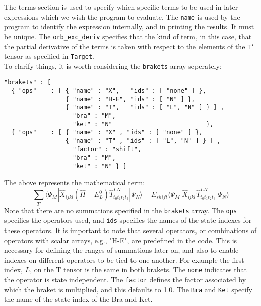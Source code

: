 The terms section is used to specify which specific terms to be used in later expressions
which we wish the program to evaluate.  The \texttt{name} is used by the program to
identify the expression internally, and in printing the results. It must be unique. 
The \texttt{orb\_exc\_deriv} specifies that the kind of term, in this case, that the partial
derivative of the terms is taken with respect to the elements of the
\texttt{T'} tensor as specified in \texttt{Target}.\\

\noindent To clarify things, it is worth considering the \texttt{brakets} array seperately:

\begin{lstlisting}[label={lst:brakets}]
"brakets" : [
  { "ops"    : [ { "name" : "X",   "ids" : [ "none" ] },
                 { "name" : "H-E", "ids" : [ "N" ] },
                 { "name" : "T",   "ids" : [ "L", "N" ] } ] ,
                   "bra" : "M",
                   "ket" : "N"                          }, 
  { "ops"    : [ { "name" : "X" , "ids" : [ "none" ] },
                 { "name" : "T" , "ids" : [ "L", "N" ] } ] ,
                   "factor" : "shift",
                   "bra" : "M",
                   "ket" : "N" } ] 
\end{lstlisting}         
The above represents the mathematical term:
\begin{equation}
\sum_{T'}
\langle \Psi_{M} |  \hat{X}_{ijkl} ( \hat{H}-E^{0}_{L} ) \hat{T}^{LN}_{ t_{0}t_{1}t_{2}t_{3} } | \Psi_{N} \rangle + 
E_{shift}\langle \Psi_{M} |  \hat{X}_{ijkl}  \hat{T}^{LN}_{ t_{0}t_{1}t_{2}t_{3} }| \Psi_{N} \rangle 
\end{equation}
\noindent Note that there are no summations specified in the \texttt{brakets} array. 
The \texttt{ops} specifies the operators used, and \texttt{ids} specifies the names of the state indexes
for these operators. It is important to note that several operators, or combinations of
operators with scalar arrays, e.g., "H-E", are predefined in the code. 
This is necessary for defining the ranges of summations later on, and also to enable indexes on 
different operators to be tied to one another. For example the first index, $L$, on the T tensor is the same in 
both brakets. The \texttt{none} indicates that the operator is state independent.
The \texttt{factor} defines the factor associated by which the braket is multiplied, and this
defaults to 1.0. The \texttt{Bra} and \texttt{Ket} specify the name of the state index of the Bra and Ket. \\

